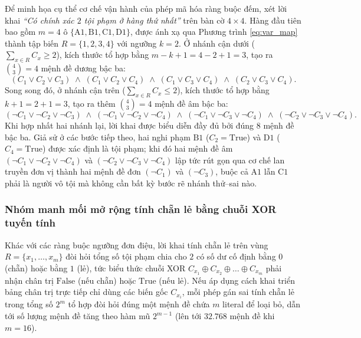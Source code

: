 Để minh họa cụ thể cơ chế vận hành của phép mã hóa ràng buộc đếm, xét lời khai
\textit{``Có chính xác $2$ tội phạm ở hàng thứ nhất''} trên bàn cờ $4 \times 4$.
Hàng đầu tiên bao gồm $m = 4$ ô $\{\text{A1}, \text{B1}, \text{C1}, \text{D1}\}$,
được ánh xạ qua Phương trình \eqref{eq:var_map} thành tập biến
$R = \{1, 2, 3, 4\}$ với ngưỡng $k = 2$. Ở nhánh cận dưới
($\sum_{x \in R} C_x \ge 2$), kích thước tổ hợp bằng $m - k + 1 = 4 - 2 + 1 = 3$,
tạo ra $\binom{4}{3} = 4$ mệnh đề dương bậc ba:
\begin{equation}
    (C_1 \vee C_2 \vee C_3) \;\wedge\; (C_1 \vee C_2 \vee C_4)
    \;\wedge\; (C_1 \vee C_3 \vee C_4) \;\wedge\; (C_2 \vee C_3 \vee C_4).
\end{equation}
Song song đó, ở nhánh cận trên ($\sum_{x \in R} C_x \le 2$), kích thước tổ hợp
bằng $k + 1 = 2 + 1 = 3$, tạo ra thêm $\binom{4}{3} = 4$ mệnh đề âm bậc ba:
\begin{equation}
    (\neg C_1 \vee \neg C_2 \vee \neg C_3)
    \;\wedge\; (\neg C_1 \vee \neg C_2 \vee \neg C_4)
    \;\wedge\; (\neg C_1 \vee \neg C_3 \vee \neg C_4)
    \;\wedge\; (\neg C_2 \vee \neg C_3 \vee \neg C_4).
\end{equation}
Khi hợp nhất hai nhánh lại, lời khai được biểu diễn đầy đủ bởi đúng $8$ mệnh đề
bậc ba. Giả sử ở các bước tiếp theo, hai nghi phạm $\text{B1}$
($C_2 = \text{True}$) và $\text{D1}$ ($C_4 = \text{True}$) được xác định là tội
phạm; khi đó hai mệnh đề âm $(\neg C_1 \vee \neg C_2 \vee \neg C_4)$ và $(\neg C_2
\vee \neg C_3 \vee \neg C_4)$ lập tức rút gọn qua cơ chế lan truyền đơn vị thành
hai mệnh đề đơn $(\neg C_1)$ và $(\neg C_3)$, buộc cả $\text{A1}$ lẫn $\text{C1}$
phải là người vô tội mà không cần bất kỳ bước rẽ nhánh thử--sai nào.

\subsubsection{Nhóm manh mối mở rộng tính chẵn lẻ bằng chuỗi XOR tuyến tính}
\label{subsubsec:parity_cnf}
Khác với các ràng buộc ngưỡng đơn điệu, lời khai tính chẵn lẻ trên vùng
$R = \{x_1, \dots, x_m\}$ đòi hỏi tổng số tội phạm chia cho $2$ có số dư cố định
bằng $0$ (chẵn) hoặc bằng $1$ (lẻ), tức biểu thức chuỗi XOR $C_{x_1} \oplus
C_{x_2} \oplus \dots \oplus C_{x_m}$ phải nhận chân trị $\text{False}$ (nếu chẵn)
hoặc $\text{True}$ (nếu lẻ). Nếu áp dụng cách khai triển bảng chân trị trực tiếp
chỉ dùng các biến gốc $C_{x_i}$, mỗi phép gán sai tính chẵn lẻ trong tổng số $2^m$
tổ hợp đòi hỏi đúng một mệnh đề chứa $m$ literal để loại bỏ, dẫn tới số lượng mệnh
đề tăng theo hàm mũ $2^{m-1}$ (lên tới $32.768$ mệnh đề khi $m = 16$).


